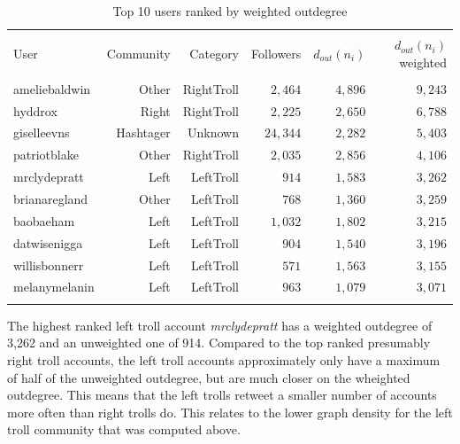 \documentclass[12pt, titlepage=true, toc=bib]{scrartcl}
\begin{document}
\begin{table}[ht] \centering 
\begin{tabular*}{.95\linewidth}{@{\extracolsep{\fill}} lrrrrr} 
\\[-1.8ex]\hline 
\hline \\[-1.8ex] 
User & Community & Category & Followers & \( d_{out}(n_{i}) \) & \( d_{out}(n_{i}) \) weighted \\ 
\hline \\[-1.8ex] 
ameliebaldwin & Other & RightTroll & $2,464$ & $4,896$ & $9,243$ \\ 
hyddrox & Right & RightTroll & $2,225$ & $2,650$ & $6,788$ \\ 
giselleevns & Hashtager & Unknown & $24,344$ & $2,282$ & $5,403$ \\ 
patriotblake & Other & RightTroll & $2,035$ & $2,856$ & $4,106$ \\ 
mrclydepratt & Left & LeftTroll & $914$ & $1,583$ & $3,262$ \\ 
brianaregland & Other & LeftTroll & $768$ & $1,360$ & $3,259$ \\ 
baobaeham & Left & LeftTroll & $1,032$ & $1,802$ & $3,215$ \\ 
datwisenigga & Left & LeftTroll & $904$ & $1,540$ & $3,196$ \\ 
willisbonnerr & Left & LeftTroll & $571$ & $1,563$ & $3,155$ \\ 
melanymelanin & Left & LeftTroll & $963$ & $1,079$ & $3,071$ \\ 
\hline \\[-1.8ex] 
\end{tabular*} 
  \caption{Top 10 users ranked by weighted outdegree} 
  \label{tab:wout} 
\end{table} 

The highest ranked left troll account \textit{mrclydepratt} has a weighted outdegree of 3,262 and an unweighted one of 914. Compared to the top ranked presumably right troll accounts, the left troll accounts approximately only have a maximum of half of the unweighted outdegree, but are much closer on the wheighted outdegree. This means that the left trolls retweet a smaller number of accounts more often than right trolls do. This relates to the lower graph density for the left troll community that was computed above.
\end{document}
